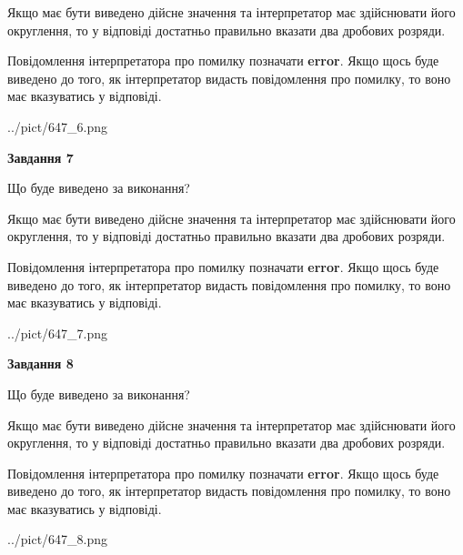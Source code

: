 \documentclass[12pt, ukrainian]{article}
\begin{document}
{\begin {Large}
Якщо має бути виведено дійсне значення та інтерпретатор має здійснювати його округлення, 
то у відповіді достатньо правильно вказати два дробових розряди.

Повідомлення інтерпретатора про помилку позначати \textbf{error}.
Якщо щось буде виведено до того, як інтерпретатор видасть повідомлення про помилку, 
то воно має вказуватись у відповіді. \par

\begin{center}
	{../pict/647_6.png}
\end{center}
\newpage

{\begin {center}\textbf{Завдання 7}\end {center}}\par
Що буде виведено за виконання? \par

Якщо має бути виведено дійсне значення та інтерпретатор має здійснювати його округлення, 
то у відповіді достатньо правильно вказати два дробових розряди.

Повідомлення інтерпретатора про помилку позначати \textbf{error}.
Якщо щось буде виведено до того, як інтерпретатор видасть повідомлення про помилку, 
то воно має вказуватись у відповіді. \par

\begin{center}
	{../pict/647_7.png}
\end{center}
\newpage

{\begin {center}\textbf{Завдання 8}\end {center}}\par
Що буде виведено за виконання? \par

Якщо має бути виведено дійсне значення та інтерпретатор має здійснювати його округлення, 
то у відповіді достатньо правильно вказати два дробових розряди.

Повідомлення інтерпретатора про помилку позначати \textbf{error}.
Якщо щось буде виведено до того, як інтерпретатор видасть повідомлення про помилку, 
то воно має вказуватись у відповіді. \par

\begin{center}
	{../pict/647_8.png}
\end{center}
\newpage


\end{Large}}
\end{document}
